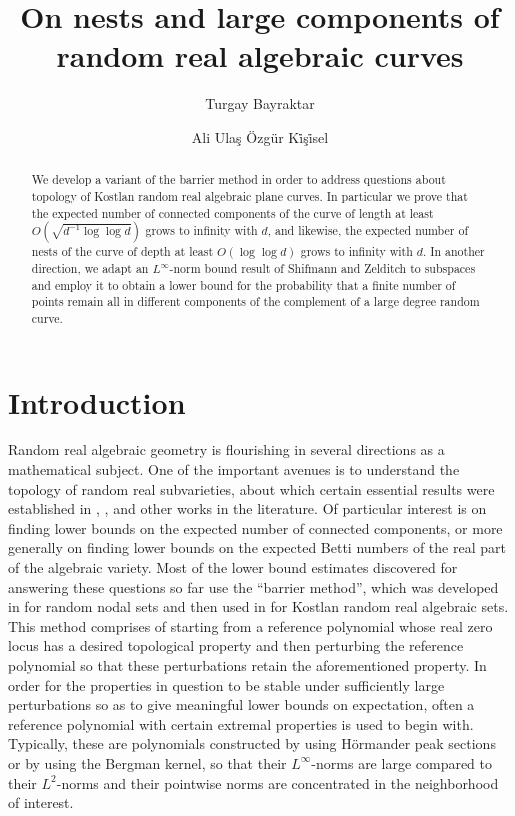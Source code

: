 \documentclass [11pt]{amsart}
\title{On nests and large components of random real algebraic curves}
\author{Turgay Bayraktar}
\author{Ali Ula\c{s} \"{O}zg\"ur K{\.i}\c{s}{\.i}sel}
\date{}
\theoremstyle{remark}
\numberwithin{equation}{section}
\numberwithin{theorem}{section}
\begin{document}
\begin{abstract}
We develop a variant of the barrier method in order to address questions about topology of Kostlan random real algebraic plane curves. In particular we prove that the expected number of connected components of the curve of length 
at least $\displaystyle{O\left(\sqrt{d^{-1}\log \log d}\right)}$ grows to infinity with $d$, and likewise, the expected number of nests of the curve of depth at least $\displaystyle{O\left(\log\log d\right)}$ grows to infinity with $d$. In another direction, we adapt an $L^{\infty}$-norm bound result of Shifmann and Zelditch to subspaces and employ it to obtain a lower bound for the probability that a finite number of points remain all in different components of the complement of a large degree random curve. 
\end{abstract}
\maketitle

\section{Introduction} 
Random real algebraic geometry is flourishing in several directions as a mathematical subject. One of the important avenues is to understand the topology of random real subvarieties, about which certain essential results were established in \cite{FLL}, \cite{GW1}, \cite{GW2}  and other works in the literature. Of particular interest is on finding lower bounds on the expected number of connected components, or more generally on finding lower bounds on the expected Betti numbers of the real part of the algebraic variety. Most of the lower bound estimates discovered for answering these questions so far use the ``barrier method'', which was developed in \cite{NS} for random nodal sets and then used in \cite{GW2} for Kostlan random real algebraic sets. This method comprises of starting from a reference polynomial whose real zero locus has a desired topological property and then perturbing the reference polynomial so that these perturbations retain the aforementioned property. In order for the properties in question to be stable under sufficiently large perturbations so as to give meaningful lower bounds on expectation, often a reference polynomial with certain extremal properties is used to begin with. Typically, these are polynomials constructed by using Hörmander peak sections or by using the Bergman kernel, so that their $L^{\infty}$-norms are large compared to their $L^2$-norms and their pointwise norms are concentrated in the neighborhood of interest.   
\end{document}
